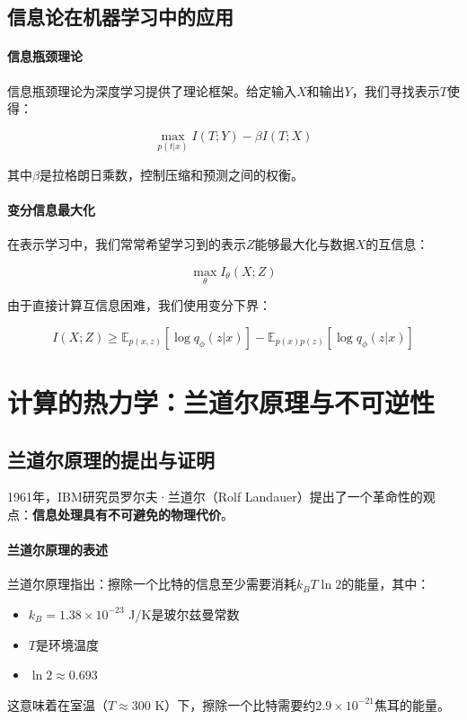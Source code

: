 \subsection{信息论在机器学习中的应用}

\paragraph{信息瓶颈理论}
信息瓶颈理论为深度学习提供了理论框架。给定输入$X$和输出$Y$，我们寻找表示$T$使得：

$$\max_{p(t|x)} I(T;Y) - \beta I(T;X)$$

其中$\beta$是拉格朗日乘数，控制压缩和预测之间的权衡。

\paragraph{变分信息最大化}
在表示学习中，我们常常希望学习到的表示$Z$能够最大化与数据$X$的互信息：

$$\max_{\theta} I_{\theta}(X;Z)$$

由于直接计算互信息困难，我们使用变分下界：

$$I(X;Z) \geq \mathbb{E}_{p(x,z)}[\log q_{\phi}(z|x)] - \mathbb{E}_{p(x)p(z)}[\log q_{\phi}(z|x)]$$

\section{计算的热力学：兰道尔原理与不可逆性}

\subsection{兰道尔原理的提出与证明}

1961年，IBM研究员罗尔夫·兰道尔（Rolf Landauer）提出了一个革命性的观点：\textbf{信息处理具有不可避免的物理代价}。

\paragraph{兰道尔原理的表述}
兰道尔原理指出：擦除一个比特的信息至少需要消耗$k_B T \ln 2$的能量，其中：
\begin{itemize}
\item $k_B = 1.38 \times 10^{-23}$ J/K是玻尔兹曼常数
\item $T$是环境温度
\item $\ln 2 \approx 0.693$
\end{itemize}

这意味着在室温（$T \approx 300$ K）下，擦除一个比特需要约$2.9 \times 10^{-21}$焦耳的能量。

